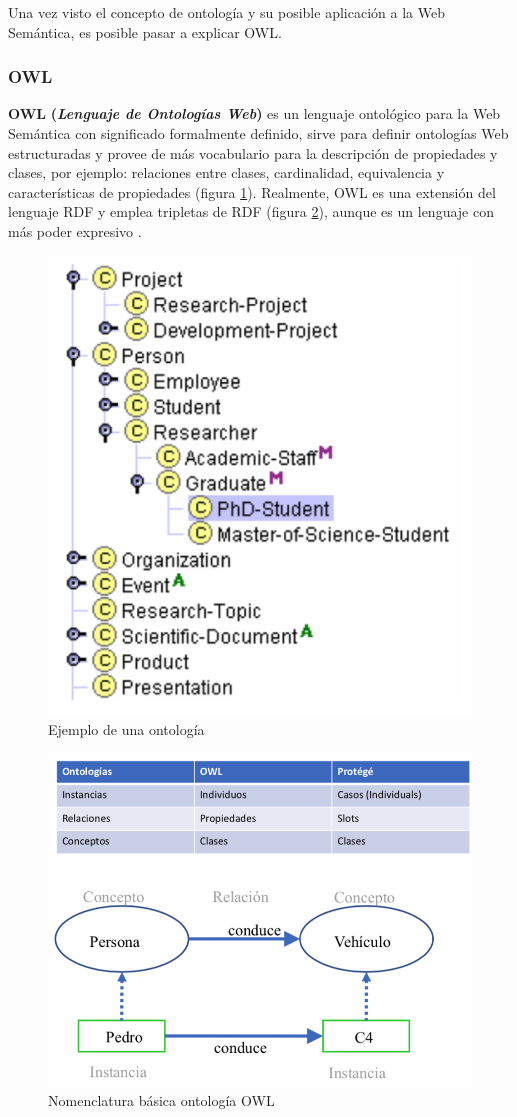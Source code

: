 
Una vez visto el concepto de ontología y su posible aplicación a la Web Semántica, es posible pasar a explicar OWL.

\subsubsection{OWL}

\textbf{OWL} \textbf{(\textit{Lenguaje de Ontologías Web})} es un lenguaje ontológico para la Web Semántica con significado formalmente definido, sirve para definir ontologías Web estructuradas y provee de más vocabulario para la descripción de propiedades y clases, por ejemplo: relaciones entre clases, cardinalidad, equivalencia y características de propiedades (figura \ref{fig:ejemplo-owl}). Realmente, OWL es una extensión del lenguaje RDF y emplea tripletas de RDF (figura \ref{fig:nomenclatura}), aunque es un lenguaje con más poder expresivo \cite{aplicacion}.

\begin{figure}[H]
	\centering
	\includegraphics[width=0.51\linewidth]{imagenes/capitulo3/ejemplo-owl}
	\caption{Ejemplo de una ontología \cite{apuntes-clase-jose}}
	\label{fig:ejemplo-owl}
\end{figure}

\begin{figure}[H]
	\centering
	\includegraphics[width=0.63\linewidth]{imagenes/capitulo3/nomenclatura}
	\caption{Nomenclatura básica ontología OWL \cite{apuntes-clase-jose}}
	\label{fig:nomenclatura}
\end{figure}

